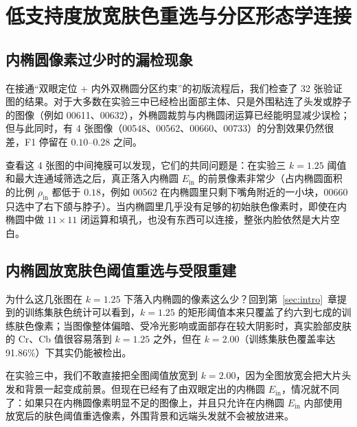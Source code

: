 \section{低支持度放宽肤色重选与分区形态学连接}\label{sec:low_support}

\subsection{内椭圆像素过少时的漏检现象}

在接通“双眼定位 + 内外双椭圆分区约束”的初版流程后，我们检查了 32 张验证图的结果。对于大多数在实验三中已经检出面部主体、只是外围粘连了头发或脖子的图像（例如 00611、00632），外椭圆裁剪与内椭圆闭运算已经能明显减少误检；但与此同时，有 4 张图像（00548、00562、00660、00733）的分割效果仍然很差，F1 停留在 $0.10\text{--}0.28$ 之间。

查看这 4 张图的中间掩膜可以发现，它们的共同问题是：在实验三 $k=1.25$ 阈值和最大连通域筛选之后，真正落入内椭圆 $E_{\text{in}}$ 的前景像素非常少（占内椭圆面积的比例 $\rho_{\text{in}}$ 都低于 $0.18$，例如 00562 在内椭圆里只剩下嘴角附近的一小块，00660 只选中了右下颌与脖子）。当内椭圆里几乎没有足够的初始肤色像素时，即使在内椭圆中做 $11\times11$ 闭运算和填孔，也没有东西可以连接，整张内脸依然是大片空白。

\subsection{内椭圆放宽肤色阈值重选与受限重建}

为什么这几张图在 $k=1.25$ 下落入内椭圆的像素这么少？回到第~\ref{sec:intro}~章提到的训练集肤色统计可以看到，$k=1.25$ 的矩形阈值本来只覆盖了约六到七成的训练肤色像素；当图像整体偏暗、受冷光影响或面部存在较大阴影时，真实脸部皮肤的 Cr、Cb 值很容易落到 $k=1.25$ 之外，但在 $k=2.00$（训练集肤色覆盖率达 91.86\%）下其实仍能被检出。

在实验三中，我们不敢直接把全图阈值放宽到 $k=2.00$，因为全图放宽会把大片头发和背景一起变成前景。但现在已经有了由双眼定出的内椭圆 $E_{\text{in}}$，情况就不同了：如果只在内椭圆像素明显不足的图像上，并且只允许在内椭圆 $E_{\text{in}}$ 内部使用放宽后的肤色阈值重选像素，外围背景和远端头发就不会被放进来。

